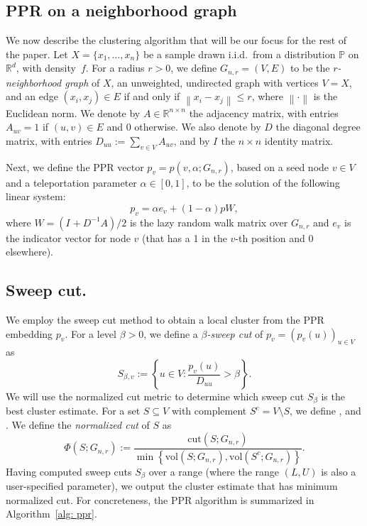 \documentclass[11pt,twoside]{article}
\newcommand{\set}[1]{\left\{#1\right\}}
\newcommand{\vol}{\mathrm{vol}}
\newcommand{\cut}{\mathrm{cut}}
\newcommand{\Reals}{\mathbb{R}}
\newcommand{\Rd}{\Reals^d}
\newcommand{\norm}[1]{\left\lVert#1\right\rVert}
\newcommand{\1}{\mathbf{1}}
\newcommand{\pbf}{p}        %
\newcommand{\ebf}[1]{{e}_{#1}}
\newcommand{\Abf}{A}
\newcommand{\Xbf}{X}             %
\newcommand{\Wbf}{W}
\newcommand{\Dbf}{D}
\newcommand{\Ibf}[1]{I_{#1}}
\newcommand{\Pbb}{\mathbb{P}}
\newcommand{\Cest}{\widehat{C}}
\begin{document}
\subsection{PPR on a neighborhood graph} 
We now describe the clustering
algorithm that will be our focus for the rest of the paper. Let $\Xbf = \{x_1,
\ldots, x_n\}$ be a sample drawn i.i.d.\ from a distribution $\Pbb$ on $\Rd$,
with density~$f$.  For a radius $r > 0$, we define $G_{n,r}=(V,E)$ to be the
\emph{$r$-neighborhood graph} of $\Xbf$, an unweighted, undirected graph with
vertices $V=\Xbf$, and an edge $(x_i,x_j) \in E$ if and only if $\norm{x_i -
x_j} \leq r$, where $\norm{\cdot}$ is the Euclidean norm. We denote by $\Abf \in
\Reals^{n \times n}$ the adjacency matrix, with entries $\Abf_{uv} = 1$ if
$(u,v) \in E$ and $0$ otherwise.  We also denote by $\Dbf$ the diagonal degree
matrix, with entries $\Dbf_{uu} := \sum_{v \in V} \Abf_{uv}$, and by $\Ibf{}$ the $n
\times n$ identity matrix.

Next, we define the PPR vector $\pbf_v = \pbf(v,\alpha;G_{n,r})$, based on
a seed node $v \in V$ and a teleportation parameter $\alpha \in [0,1]$, to be 
the solution of the following linear system:
\begin{equation}
\label{eqn: ppr_vector}
\pbf_v = \alpha \ebf{v} + (1 - \alpha) \pbf \Wbf,
\end{equation}
where $\Wbf = (\Ibf{} + \Dbf^{-1}\Abf)/2$ is the lazy random walk matrix over
$G_{n,r}$ and $e_{v}$ is the indicator vector for node $v$ (that has a 1 in the
$v$-th position and 0 elsewhere). 

\subsection{Sweep cut.}
\label{subsection: sweep_cut}

We employ the sweep cut method to obtain a local cluster from the PPR embedding $\pbf_v$. For a level $\beta > 0$, we define a \emph{$\beta$-sweep cut} of $\pbf_v = (\pbf_v(u))_{u \in V}$
as   
\begin{equation}
\label{eqn: sweep_cuts}
S_{\beta,v} := \set{u \in V: \frac{\pbf_v(u)}{\Dbf_{uu}} > \beta}.
\end{equation}
We will use the normalized cut metric to determine which sweep cut $S_{\beta}$
is the best cluster estimate. For a set $S \subseteq V$ with complement $S^c = V
\setminus S$, we define \smash{$\cut(S;G_{n,r}) := \sum_{u \in S, v \in S^c}
\Abf_{uv}$}, and \smash{$\vol(S; G_{n,r}) := \sum_{u \in S} \Dbf_{uu}$}.  We
define the \emph{normalized cut} of $S$ as
\begin{equation}
\label{eqn: normalized_cut}
\Phi(S; G_{n,r}) := \frac{\cut(S;G_{n,r})}{\min \set{\vol(S; G_{n,r}), \vol(S^c; G_{n,r})}}.
\end{equation}
Having computed sweep cuts $S_{\beta}$ over a range  (where the range $(L,U)$ is also a user-specified parameter), we output the cluster estimate
\smash{$\Cest = S_{\beta^*}$} that has minimum normalized cut.
For concreteness, the PPR algorithm is summarized in Algorithm~\ref{alg: ppr}. 
\end{document}
